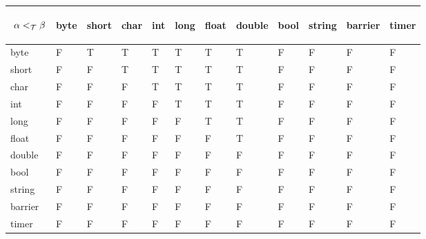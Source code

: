 \documentclass[]{article}
\begin{document}
\begin{center}
\begin{tabular}{|l||l|l|l|l|l|l|l|l|l|l|l|}\hline
\begin{turn}{45}$\,\,\alpha <_{\cal T} \beta$\end{turn} & 
	\begin{turn}{90}{byte}\end{turn} & 
	\begin{turn}{90}{short}\end{turn} &
	\begin{turn}{90}{char}\end{turn} &
	\begin{turn}{90}{int}\end{turn} &
	\begin{turn}{90}{long}\end{turn} &
	\begin{turn}{90}{float} \end{turn}&
	\begin{turn}{90}{double\quad{}\quad{}}\end{turn} &
	\begin{turn}{90}{bool}\end{turn}&
	\begin{turn}{90}{string}\end{turn} &
	\begin{turn}{90}{barrier}\end{turn} &
	\begin{turn}{90}{timer}\end{turn} \\ \hline\hline
byte    & F & \cellcolor{gray!25}T & \cellcolor{gray!25}T & \cellcolor{gray!25}T & \cellcolor{gray!25}T & \cellcolor{gray!25}T & \cellcolor{gray!25}T & F & F & F & F\\ \hline
short   & F & F & \cellcolor{gray!25}T & \cellcolor{gray!25}T & \cellcolor{gray!25}T & \cellcolor{gray!25}T & \cellcolor{gray!25}T & F & F& F & F\\ \hline
char    & F & F & F & \cellcolor{gray!25}T & \cellcolor{gray!25}T & \cellcolor{gray!25}T & \cellcolor{gray!25}T & F & F & F & F\\ \hline
int     & F & F & F & F & \cellcolor{gray!25}T & \cellcolor{gray!25}T & \cellcolor{gray!25}T & F & F & F & F\\ \hline
long    & F & F & F & F & F & \cellcolor{gray!25}T & \cellcolor{gray!25}T & F & F & F & F\\ \hline
float   & F & F & F & F & F & F & \cellcolor{gray!25}T & F & F & F & F\\ \hline
double  & F & F & F & F & F & F & F & F & F & F & F\\ \hline
bool    & F & F & F & F & F & F & F & F & F & F & F \\ \hline
string  & F & F & F & F & F & F & F & F & F & F & F \\ \hline
barrier & F & F & F & F & F & F & F & F & F & F & F \\ \hline
timer   & F & F & F & F & F & F & F & F & F & F & F\\ \hline
\end{tabular}
\end{center}
\end{document}

